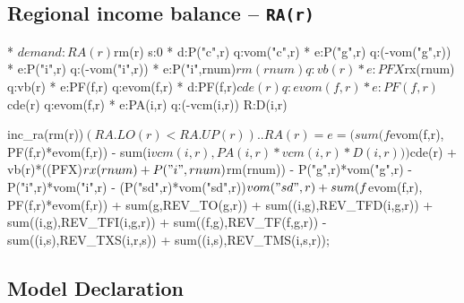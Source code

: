 \subsection*{Regional income balance -- \texttt{RA(r)}}
\begin{GAMSCode*}
* $demand:RA(r)$rm(r)  s:0
*       d:P("c",r)              q:vom("c",r)
*       e:P("g",r)              q:(-vom("g",r))
*       e:P("i",r)              q:(-vom("i",r))
*       e:P("i",rnum)$rm(rnum)  q:vb(r)
*       e:PFX$rx(rnum)          q:vb(r)
*       e:PF(f,r)               q:evom(f,r)
*       d:PF(f,r)$cde(r)        q:evom(f,r)
*       e:PF(f,r)$cde(r)        q:evom(f,r)
*       e:PA(i,r)               q:(-vcm(i,r))   R:D(i,r)

inc_ra(rm(r))$(RA.LO(r) < RA.UP(r))..
        RA(r) =e=       ( sum(f$evom(f,r), PF(f,r)*evom(f,r))
                        - sum(i$vcm(i,r), PA(i,r)*vcm(i,r)*D(i,r)) )$cde(r)
                        + vb(r)*((PFX)$rx(rnum)+P("i",rnum)$rm(rnum))
                        - P("g",r)*vom("g",r)
                        - P("i",r)*vom("i",r)
                        - (P("sd",r)*vom("sd",r))$vom("sd",r)
                        + sum(f$evom(f,r), PF(f,r)*evom(f,r))
                        + sum(g,REV_TO(g,r))
                        + sum((i,g),REV_TFD(i,g,r))
                        + sum((i,g),REV_TFI(i,g,r))
                        + sum((f,g),REV_TF(f,g,r))
                        - sum((i,s),REV_TXS(i,r,s))
                        + sum((i,s),REV_TMS(i,s,r));
\end{GAMSCode*}


\subsection*{Model Declaration}

